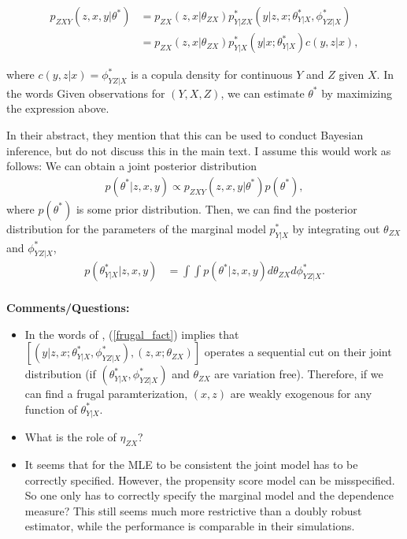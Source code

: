 \documentclass[10pt]{article}
\begin{document}
\begin{align} \label{frugal_fact}
	p_{ZXY}(z, x, y | \theta^*) &= p_{ZX}(z, x | \theta_{ZX}) p_{Y|ZX}^*(y|z, x; \theta_{Y|X}^*, \phi_{YZ | X}^*) \\
	&= p_{ZX}(z, x | \theta_{ZX}) p_{Y|X}^*(y | x; \theta_{Y|X}^*) c(y, z| x),
\end{align}

where $c(y, z | x) = \phi_{YZ | X}^* $ is a copula density for continuous $Y$ and $Z$ given $X$. In the words
 Given observations for $(Y, X, Z)$, we can estimate $\theta^*$ by maximizing the expression above. 

In their abstract, they mention that this can be used to conduct Bayesian inference, but do not discuss this in the main text. I assume this would work as follows: We can obtain a joint posterior distribution
\begin{align*}
	p(\theta^* | z, x, y) \propto p_{ZXY}(z, x, y | \theta^*) p(\theta^*),
\end{align*}
where $p(\theta^*)$ is some prior distribution. Then, we can find the posterior distribution for the parameters of the marginal model $p_{Y|X}^*$ by integrating out $\theta_{ZX}$ and $\phi_{YZ | X}^*$,
\begin{align*}
	p(\theta_{Y|X}^* | z, x, y) &= \int \int p(\theta^* | z, x, y) d\theta_{ZX} d\phi_{YZ | X}^*.
\end{align*} \\


\textbf{Comments/Questions:}
\begin{itemize}
	\item In the words of \cite{engle1983}, (\ref{frugal_fact}) implies that $[(y|z, x; \theta_{Y|X}^*, \phi_{YZ | X}^*), (z, x ;  \theta_{ZX})]$ operates a sequential cut on their joint distribution (if $(\theta_{Y|X}^*, \phi_{YZ | X}^*)$ and $\theta_{ZX}$ are variation free). Therefore, if we can find a frugal paramterization, $(x, z)$ are weakly exogenous for any function of $\theta_{Y|X}^*$.
	\item What is the role of $\eta_{ZX}$?
	\item It seems that for the MLE to be consistent the joint model has to be correctly specified. However, the propensity score model can be misspecified. So one only has to correctly specify the marginal model and the dependence measure? This still seems much more restrictive than a doubly robust estimator, while the performance is comparable in their simulations.
\end{itemize}






\end{document}
